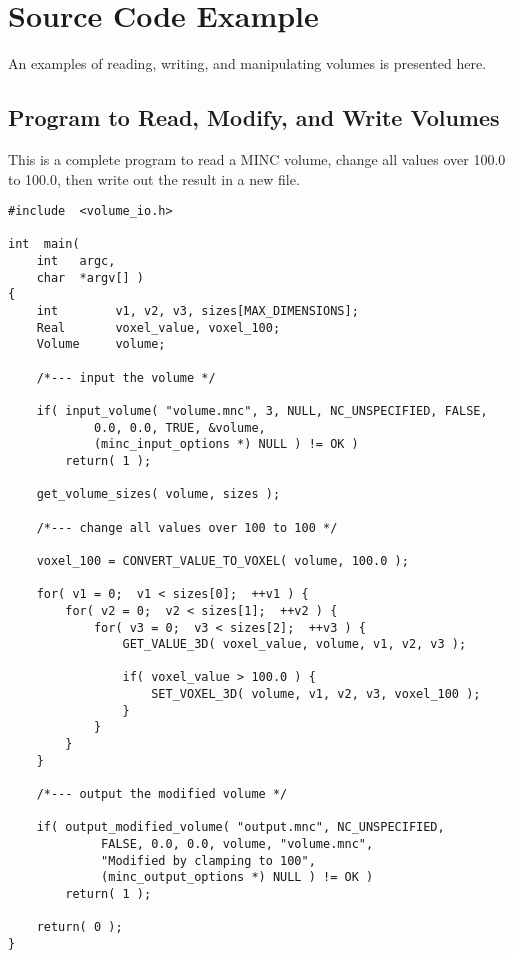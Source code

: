 
\section{Source Code Example}

An examples of reading, writing, and manipulating volumes is
presented here.

\subsection{Program to Read, Modify, and Write Volumes}

This is a complete program to read a MINC volume, change all values
over 100.0 to 100.0, then write out the result in a new file.

{\small
\begin{verbatim}
#include  <volume_io.h>

int  main(
    int   argc,
    char  *argv[] )
{
    int        v1, v2, v3, sizes[MAX_DIMENSIONS];
    Real       voxel_value, voxel_100;
    Volume     volume;

    /*--- input the volume */

    if( input_volume( "volume.mnc", 3, NULL, NC_UNSPECIFIED, FALSE,
            0.0, 0.0, TRUE, &volume,
            (minc_input_options *) NULL ) != OK )
        return( 1 );

    get_volume_sizes( volume, sizes );

    /*--- change all values over 100 to 100 */

    voxel_100 = CONVERT_VALUE_TO_VOXEL( volume, 100.0 );

    for( v1 = 0;  v1 < sizes[0];  ++v1 ) {
        for( v2 = 0;  v2 < sizes[1];  ++v2 ) {
            for( v3 = 0;  v3 < sizes[2];  ++v3 ) {
                GET_VALUE_3D( voxel_value, volume, v1, v2, v3 );

                if( voxel_value > 100.0 ) {
                    SET_VOXEL_3D( volume, v1, v2, v3, voxel_100 );
                }
            }
        }
    }

    /*--- output the modified volume */

    if( output_modified_volume( "output.mnc", NC_UNSPECIFIED,
             FALSE, 0.0, 0.0, volume, "volume.mnc",
             "Modified by clamping to 100",
             (minc_output_options *) NULL ) != OK )
        return( 1 );

    return( 0 );
}
\end{verbatim}
}

